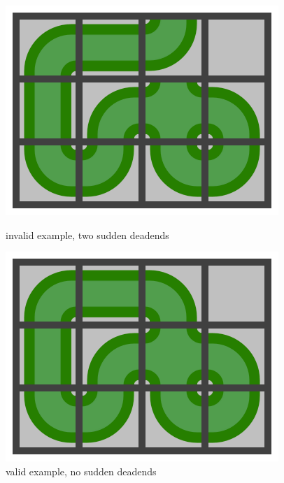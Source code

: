 \begin{figure}[h]
  \centering
  \begin{minipage}[t]{0.45\textwidth}\centering%
      \includegraphics[width=\textwidth]{pipe_rotation_2}
      \caption{invalid example, two sudden deadends}
  \end{minipage} \hfill
  \begin{minipage}[t]{0.45\textwidth}\centering%
      \includegraphics[width=\textwidth]{pipe_rotation_3} 
      \caption{valid example, no sudden deadends}
  \end{minipage}
\end{figure}

% 

